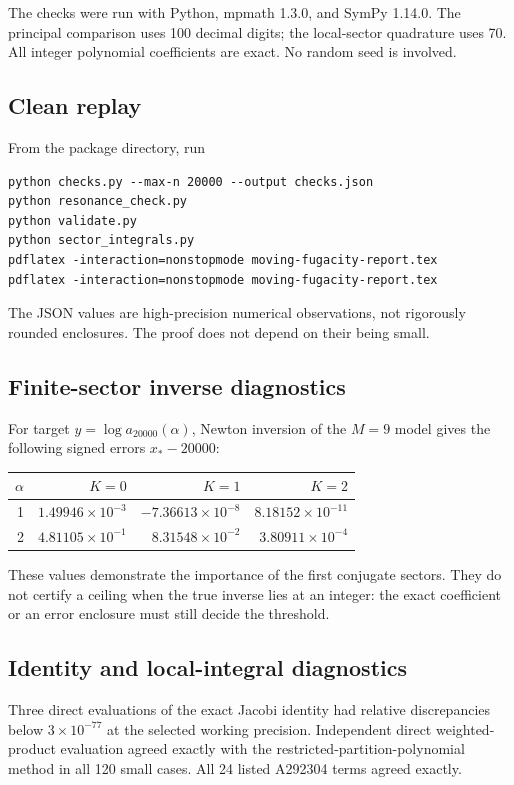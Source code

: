 \documentclass[11pt,letterpaper]{article}
\begin{document}
The checks were run with Python, mpmath 1.3.0, and SymPy 1.14.0. The principal comparison uses 100 decimal digits; the local-sector quadrature uses 70. All integer polynomial coefficients are exact. No random seed is involved.

\subsection{Clean replay}
From the package directory, run
\begin{verbatim}
python checks.py --max-n 20000 --output checks.json
python resonance_check.py
python validate.py
python sector_integrals.py
pdflatex -interaction=nonstopmode moving-fugacity-report.tex
pdflatex -interaction=nonstopmode moving-fugacity-report.tex
\end{verbatim}
The JSON values are high-precision numerical observations, not rigorously rounded enclosures. The proof does not depend on their being small.

\subsection{Finite-sector inverse diagnostics}
For target $y=\log a_{20000}(\alpha)$, Newton inversion of the $M=9$ model gives the following signed errors $x_*-20000$:
\begin{center}
\begin{tabular}{rrrr}
\toprule
$\alpha$ & $K=0$ & $K=1$ & $K=2$\\
\midrule
1 & $1.49946\times10^{-3}$ & $-7.36613\times10^{-8}$ & $8.18152\times10^{-11}$\\
2 & $4.81105\times10^{-1}$ & $8.31548\times10^{-2}$ & $3.80911\times10^{-4}$\\
\bottomrule
\end{tabular}
\end{center}
These values demonstrate the importance of the first conjugate sectors. They do not certify a ceiling when the true inverse lies at an integer: the exact coefficient or an error enclosure must still decide the threshold.

\subsection{Identity and local-integral diagnostics}
Three direct evaluations of the exact Jacobi identity had relative discrepancies below $3\times10^{-77}$ at the selected working precision. Independent direct weighted-product evaluation agreed exactly with the restricted-partition-polynomial method in all 120 small cases. All 24 listed A292304 terms agreed exactly.
\end{document}

